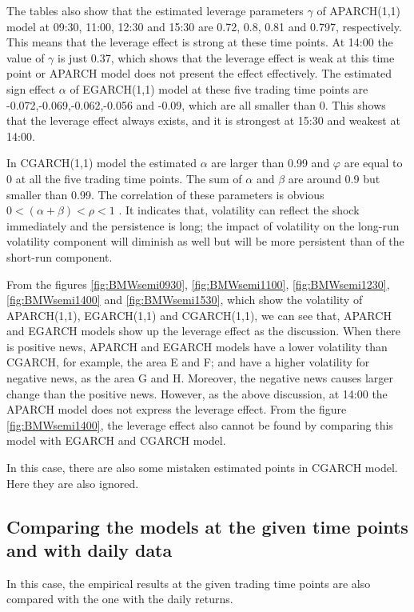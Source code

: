 The tables also show that the estimated leverage parameters $\gamma$  of APARCH(1,1) model at 09:30, 11:00, 12:30 and 15:30 are 0.72, 0.8, 0.81 and 0.797, respectively. This means that the leverage effect is strong at these time points. At 14:00 the value of $\gamma$  is just 0.37, which shows that the leverage effect is weak at this time point or APARCH model does not present the effect effectively. The estimated sign effect $\alpha$  of EGARCH(1,1) model at these five trading time points are -0.072,-0.069,-0.062,-0.056 and -0.09, which are all smaller than 0. This shows that the leverage effect always exists, and it is strongest at 15:30 and weakest at 14:00.

In CGARCH(1,1) model the estimated $\alpha$  are larger than 0.99 and $\varphi$  are equal to 0 at all the five trading time points. The sum of  $\alpha$  and $\beta$ are around 0.9 but smaller than 0.99. The correlation of these parameters is obvious  $0 < (\alpha + \beta) < \rho <1$ . It indicates that, volatility can reflect the shock immediately and the persistence is long; the impact of volatility on the long-run volatility component will diminish as well but will be more persistent than of the short-run component.

From the figures \ref{fig:BMWsemi0930}, \ref{fig:BMWsemi1100}, \ref{fig:BMWsemi1230}, \ref{fig:BMWsemi1400} and \ref{fig:BMWsemi1530}, which show the volatility of APARCH(1,1), EGARCH(1,1) and CGARCH(1,1), we can see that, APARCH and EGARCH models show up the leverage effect as the discussion. When there is positive news, APARCH and EGARCH models have a lower volatility than CGARCH, for example, the area E and F; and have a higher volatility for negative news, as the area G and H. Moreover, the negative news causes larger change than the positive news. However, as the above discussion, at 14:00 the APARCH model does not express the leverage effect. From the figure \ref{fig:BMWsemi1400}, the leverage effect also cannot be found by comparing this model with EGARCH and CGARCH model.

In this case, there are also some mistaken estimated points in CGARCH model. Here they are also ignored.

\subsection{Comparing the models at the given time points and with daily data}

In this case, the empirical results at the given trading time points are also compared with the one with the daily returns.

